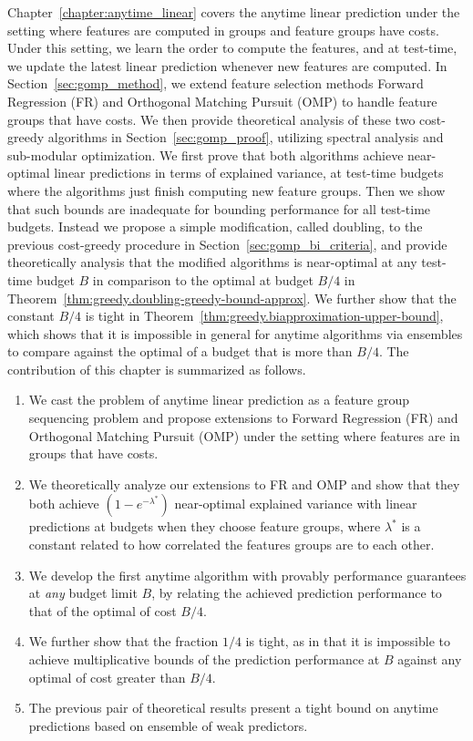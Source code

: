 Chapter~\ref{chapter:anytime_linear} covers the anytime linear prediction under the setting where features are computed in groups and feature groups have costs. Under this setting, we learn the order to compute the features, and at test-time, we update the latest linear prediction whenever new features are computed. In Section~\ref{sec:gomp_method}, we extend feature selection methods Forward Regression (FR) and Orthogonal Matching Pursuit (OMP) to handle feature groups that have costs. We then provide theoretical analysis of these two cost-greedy algorithms in Section~\ref{sec:gomp_proof}, utilizing spectral analysis and sub-modular optimization. We first prove that both algorithms achieve near-optimal linear predictions in terms of explained variance, at test-time budgets where the algorithms just finish computing new feature groups. 
Then we show that such bounds are inadequate for bounding performance for all test-time budgets. Instead we propose a simple modification, called doubling, to the previous cost-greedy procedure in Section~\ref{sec:gomp_bi_criteria}, and provide theoretically analysis that the modified algorithms is near-optimal at any test-time budget $B$ in comparison to the optimal at budget $B/4$ in Theorem~\ref{thm:greedy.doubling-greedy-bound-approx}. We further show that the constant $B/4$ is tight in Theorem~\ref{thm:greedy.biapproximation-upper-bound}, which shows that it is impossible in general for anytime algorithms via ensembles to compare against the optimal of a budget that is more than $B/4$. The contribution of this chapter is summarized as follows.

\begin{enumerate}
\item We cast the problem of anytime linear prediction 
as a feature group sequencing problem  
and propose extensions to Forward Regression (FR) and Orthogonal Matching Pursuit (OMP)
under the setting where features are in
groups that have costs. 
\item We theoretically analyze our extensions to FR and OMP 
and show that they both achieve $(1-e^{-\lambda^*})$ near-optimal 
explained variance with linear predictions at budgets when 
they choose feature groups, where $\lambda^*$ is a constant related to how correlated the 
features groups are to each other.
\item We develop the first anytime algorithm 
with provably performance guarantees at \textit{any} budget limit $B$, 
by relating the achieved prediction performance to that of the optimal of cost 
$B/4$. 
\item We further show that the fraction $1/4$ is tight, as in that it is 
impossible to achieve multiplicative bounds of the prediction performance at $B$ 
against any optimal of cost greater than $B/4$. 
\item The previous pair of theoretical results  present a tight bound on 
anytime predictions based on ensemble of weak predictors.
\end{enumerate}

